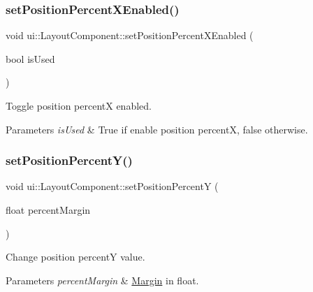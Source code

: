\subsubsection{\texorpdfstring{set\+Position\+Percent\+X\+Enabled()}{setPositionPercentXEnabled()}\hspace{0.1cm}{\footnotesize\ttfamily [2/2]}}
{\footnotesize\ttfamily void ui\+::\+Layout\+Component\+::set\+Position\+Percent\+X\+Enabled (\begin{DoxyParamCaption}\item[{bool}]{is\+Used }\end{DoxyParamCaption})}

Toggle position percentX enabled. 
\begin{DoxyParams}{Parameters}
{\em is\+Used} & True if enable position percentX, false otherwise. \\
\hline
\end{DoxyParams}
\mbox{\label{classui_1_1LayoutComponent_a3bdc6df3202598dd866ec8c2fb1d10e6}} 
\subsubsection{\texorpdfstring{set\+Position\+Percent\+Y()}{setPositionPercentY()}\hspace{0.1cm}{\footnotesize\ttfamily [1/2]}}
{\footnotesize\ttfamily void ui\+::\+Layout\+Component\+::set\+Position\+PercentY (\begin{DoxyParamCaption}\item[{float}]{percent\+Margin }\end{DoxyParamCaption})}

Change position percentY value. 
\begin{DoxyParams}{Parameters}
{\em percent\+Margin} & \hyperlink{classui_1_1Margin}{Margin} in float. \\
\hline
\end{DoxyParams}
\mbox{\label{classui_1_1LayoutComponent_a3bdc6df3202598dd866ec8c2fb1d10e6}} 
